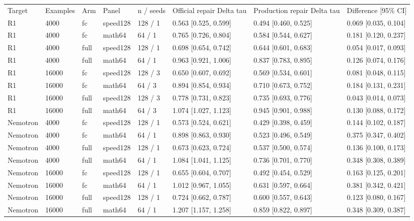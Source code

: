 \begin{tabular}{llllllll}
Target & Examples & Arm & Panel & n / seeds & Official repair Delta tau & Production repair Delta tau & Difference [95\% CI] \\
R1 & 4000 & fc & speed128 & 128 / 1 & 0.563 [0.525, 0.599] & 0.494 [0.460, 0.525] & 0.069 [0.035, 0.104] \\
R1 & 4000 & fc & math64 & 64 / 1 & 0.765 [0.726, 0.804] & 0.584 [0.544, 0.627] & 0.181 [0.120, 0.237] \\
R1 & 4000 & full & speed128 & 128 / 1 & 0.698 [0.654, 0.742] & 0.644 [0.601, 0.683] & 0.054 [0.017, 0.093] \\
R1 & 4000 & full & math64 & 64 / 1 & 0.963 [0.921, 1.006] & 0.837 [0.783, 0.895] & 0.126 [0.074, 0.176] \\
R1 & 16000 & fc & speed128 & 128 / 3 & 0.650 [0.607, 0.692] & 0.569 [0.534, 0.601] & 0.081 [0.048, 0.115] \\
R1 & 16000 & fc & math64 & 64 / 3 & 0.894 [0.854, 0.934] & 0.710 [0.673, 0.752] & 0.184 [0.131, 0.231] \\
R1 & 16000 & full & speed128 & 128 / 3 & 0.778 [0.731, 0.823] & 0.735 [0.693, 0.776] & 0.043 [0.014, 0.073] \\
R1 & 16000 & full & math64 & 64 / 3 & 1.074 [1.027, 1.123] & 0.945 [0.901, 0.988] & 0.130 [0.088, 0.172] \\
Nemotron & 4000 & fc & speed128 & 128 / 1 & 0.573 [0.524, 0.621] & 0.429 [0.398, 0.459] & 0.144 [0.102, 0.187] \\
Nemotron & 4000 & fc & math64 & 64 / 1 & 0.898 [0.863, 0.930] & 0.523 [0.496, 0.549] & 0.375 [0.347, 0.402] \\
Nemotron & 4000 & full & speed128 & 128 / 1 & 0.673 [0.623, 0.724] & 0.537 [0.500, 0.574] & 0.136 [0.100, 0.173] \\
Nemotron & 4000 & full & math64 & 64 / 1 & 1.084 [1.041, 1.125] & 0.736 [0.701, 0.770] & 0.348 [0.308, 0.389] \\
Nemotron & 16000 & fc & speed128 & 128 / 1 & 0.655 [0.604, 0.707] & 0.492 [0.454, 0.529] & 0.163 [0.125, 0.201] \\
Nemotron & 16000 & fc & math64 & 64 / 1 & 1.012 [0.967, 1.055] & 0.631 [0.597, 0.664] & 0.381 [0.342, 0.421] \\
Nemotron & 16000 & full & speed128 & 128 / 1 & 0.724 [0.662, 0.787] & 0.600 [0.557, 0.643] & 0.123 [0.080, 0.167] \\
Nemotron & 16000 & full & math64 & 64 / 1 & 1.207 [1.157, 1.258] & 0.859 [0.822, 0.897] & 0.348 [0.309, 0.387] \\
\end{tabular}
